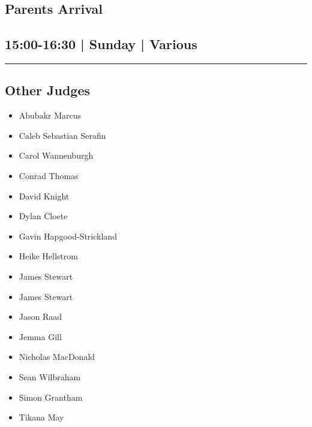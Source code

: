 \documentclass[10pt, A5]{article}
\begin{document}
        \begin{framed}
        \begin{minipage}{\textwidth}

        \setcounter{section}{88}
        \section{Parents Arrival}
        \subsection*{15:00-16:30 | Sunday | Various}

        \vspace{0.25cm}
        \hrule
        \vspace{0.25cm}


        \subsection*{Other Judges}
                    

        	\begin{multicols}{2}

		\begin{itemize}
									\item Abubakr Marcus
									\item Caleb Sebastian Serafin
									\item Carol Wannenburgh
									\item Conrad Thomas
									\item David Knight
									\item Dylan Cloete
									\item Gavin Hapgood-Strickland
									\item Heike Hellstrom
									\item James Stewart
						\end{itemize}

		\vfill\null
		\columnbreak

		\begin{itemize}
									\item James Stewart
									\item Jason Raad
									\item Jemma Gill
									\item Nicholas MacDonald
									\item Sean Wilbraham
									\item Simon Grantham
									\item Tikana May
						\end{itemize}


\end{multicols}
\end{minipage}
\end{framed}
\end{document}
